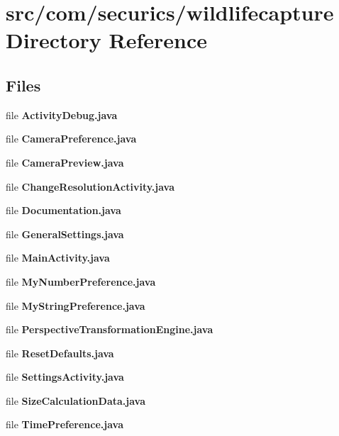 \section{src/com/securics/wildlifecapture Directory Reference}
\label{dir_99e5fe23c67375e957acd05c98148ca8}
\subsection*{Files}
\begin{DoxyCompactItemize}
\item 
file {\bf Activity\+Debug.\+java}
\item 
file {\bf Camera\+Preference.\+java}
\item 
file {\bf Camera\+Preview.\+java}
\item 
file {\bf Change\+Resolution\+Activity.\+java}
\item 
file {\bf Documentation.\+java}
\item 
file {\bf General\+Settings.\+java}
\item 
file {\bf Main\+Activity.\+java}
\item 
file {\bf My\+Number\+Preference.\+java}
\item 
file {\bf My\+String\+Preference.\+java}
\item 
file {\bf Perspective\+Transformation\+Engine.\+java}
\item 
file {\bf Reset\+Defaults.\+java}
\item 
file {\bf Settings\+Activity.\+java}
\item 
file {\bf Size\+Calculation\+Data.\+java}
\item 
file {\bf Time\+Preference.\+java}
\end{DoxyCompactItemize}
